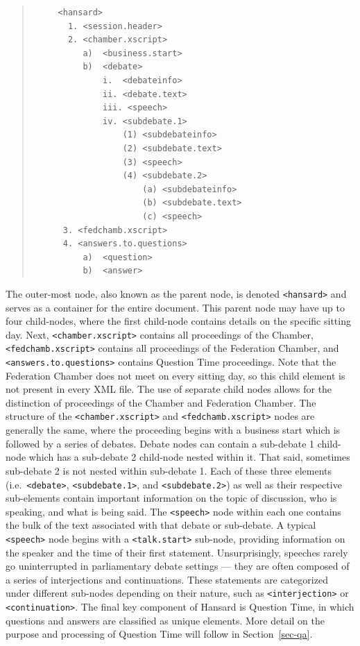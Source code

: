 \documentclass[
  letterpaper,
  DIV=11,
  numbers=noendperiod]{scrartcl}
\begin{document}
\begin{quote}
\begin{verbatim}
     <hansard>
       1. <session.header>
       2. <chamber.xscript>
          a)  <business.start>
          b)  <debate>
              i.  <debateinfo>
              ii. <debate.text>
              iii. <speech>
              iv. <subdebate.1>
                  (1) <subdebateinfo>
                  (2) <subdebate.text>
                  (3) <speech>
                  (4) <subdebate.2>
                      (a) <subdebateinfo>
                      (b) <subdebate.text>
                      (c) <speech>
      3. <fedchamb.xscript>
      4. <answers.to.questions>
          a)  <question>
          b)  <answer>
\end{verbatim}
\end{quote}

The outer-most node, also known as the parent node, is denoted
\texttt{\textless{}hansard\textgreater{}} and serves as a container for
the entire document. This parent node may have up to four child-nodes,
where the first child-node contains details on the specific sitting day.
Next, \texttt{\textless{}chamber.xscript\textgreater{}} contains all
proceedings of the Chamber,
\texttt{\textless{}fedchamb.xscript\textgreater{}} contains all
proceedings of the Federation Chamber, and
\texttt{\textless{}answers.to.questions\textgreater{}} contains Question
Time proceedings. Note that the Federation Chamber does not meet on
every sitting day, so this child element is not present in every XML
file. The use of separate child nodes allows for the distinction of
proceedings of the Chamber and Federation Chamber. The structure of the
\texttt{\textless{}chamber.xscript\textgreater{}} and
\texttt{\textless{}fedchamb.xscript\textgreater{}} nodes are generally
the same, where the proceeding begins with a business start which is
followed by a series of debates. Debate nodes can contain a sub-debate 1
child-node which has a sub-debate 2 child-node nested within it. That
said, sometimes sub-debate 2 is not nested within sub-debate 1. Each of
these three elements (i.e.~\texttt{\textless{}debate\textgreater{}},
\texttt{\textless{}subdebate.1\textgreater{}}, and
\texttt{\textless{}subdebate.2\textgreater{}}) as well as their
respective sub-elements contain important information on the topic of
discussion, who is speaking, and what is being said. The
\texttt{\textless{}speech\textgreater{}} node within each one contains
the bulk of the text associated with that debate or sub-debate. A
typical \texttt{\textless{}speech\textgreater{}} node begins with a
\texttt{\textless{}talk.start\textgreater{}} sub-node, providing
information on the speaker and the time of their first statement.
Unsurprisingly, speeches rarely go uninterrupted in parliamentary debate
settings --- they are often composed of a series of interjections and
continuations. These statements are categorized under different
sub-nodes depending on their nature, such as
\texttt{\textless{}interjection\textgreater{}} or
\texttt{\textless{}continuation\textgreater{}}. The final key component
of Hansard is Question Time, in which questions and answers are
classified as unique elements. More detail on the purpose and processing
of Question Time will follow in Section~\ref{sec-qa}.
\end{document}
